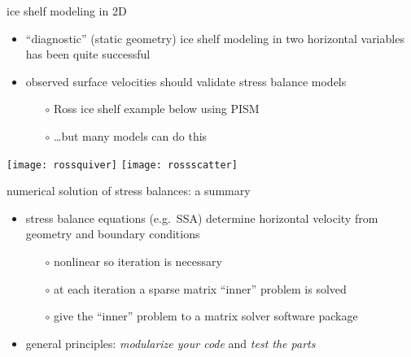 \begin{frame}{ice shelf modeling in 2D}

\begin{itemize}
\item ``diagnostic'' (static geometry) ice shelf modeling in two horizontal variables has been quite successful
\item observed surface velocities should validate stress balance models
  \begin{itemize}
  \item[$\circ$] Ross ice shelf example below using PISM
  \item[$\circ$] \dots but many models can do this
  \end{itemize}
\end{itemize}

\begin{center}
  \texttt{[image: rossquiver]} \quad  \texttt{[image: rossscatter]}
\end{center}
\end{frame}


\begin{frame}{numerical solution of stress balances: a summary}

\begin{itemize}
\item stress balance equations (e.g.~SSA) determine horizontal velocity from geometry and boundary conditions
  \begin{itemize}
  \item[$\circ$] nonlinear so iteration is necessary
  \item[$\circ$] at each iteration a sparse matrix ``inner'' problem is solved
  \item[$\circ$] give the ``inner'' problem to a matrix solver software package
  \end{itemize}

\bigskip
\item general principles: \emph{modularize your code} and \emph{test the parts}
\end{itemize}
\end{frame}


